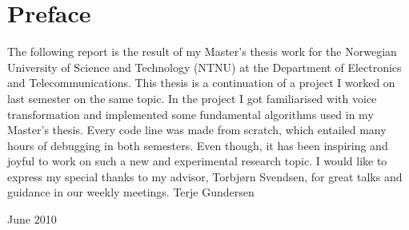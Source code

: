 \chapter*{Preface} %
\label{cha:preface}
The following report is the result of my Master's thesis work for the Norwegian University of Science and Technology (NTNU) at the Department of Electronics and Telecommunications. This thesis is a continuation of a project I worked on last semester on the same topic. In the project I got familiarised with voice transformation and implemented some fundamental algorithms used in my Master's thesis. Every code line was made from scratch, which entailed many hours of debugging in both semesters. Even though, it has been inspiring and joyful to work on such a new and experimental research topic.
\newline \newline
\noindent
I would like to express my special thanks to my advisor, Torbjørn Svendsen, for great talks and guidance in our weekly meetings.
\newline \newline \newline
\noindent
Terje Gundersen

\noindent
June 2010
